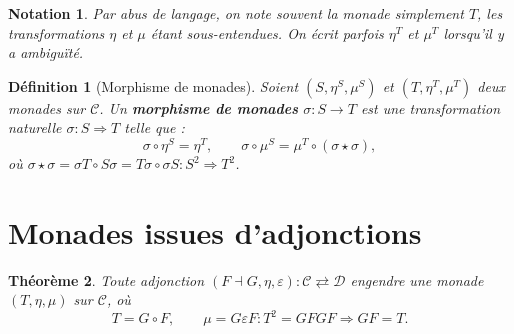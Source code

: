\documentclass[a4paper,12pt]{book}
\newtheorem{theoreme}{Théorème}[chapter]
\newtheorem{definition}[theoreme]{Définition}
\newtheorem*{notation}{Notation}
\begin{document}
\begin{notation}\label{not:monade}
Par abus de langage, on note souvent la monade simplement $T$,
les transformations $\eta$ et $\mu$ étant sous-entendues.
On écrit parfois $\eta^T$ et $\mu^T$ lorsqu'il y a ambiguïté.
\end{notation}

\begin{definition}[Morphisme de monades]\label{def:morphisme-monades}
Soient $(S, \eta^S, \mu^S)$ et $(T, \eta^T, \mu^T)$ deux monades
sur $\mathcal{C}$.
Un \textbf{morphisme de monades} $\sigma \colon S \to T$ est une
transformation naturelle $\sigma \colon S \Rightarrow T$ telle que :
\[
    \sigma \circ \eta^S = \eta^T, \qquad
    \sigma \circ \mu^S = \mu^T \circ (\sigma \star \sigma),
\]
où $\sigma \star \sigma = \sigma T \circ S\sigma = T\sigma \circ \sigma S
\colon S^2 \Rightarrow T^2$.
\end{definition}


\section{Monades issues d'adjonctions}\label{sec:monade-adjonction}

\begin{theoreme}\label{thm:adjonction-monade}
Toute adjonction $(F \dashv G, \eta, \varepsilon) \colon
\mathcal{C} \rightleftarrows \mathcal{D}$ engendre une monade
$(T, \eta, \mu)$ sur $\mathcal{C}$, où
\[
    T = G \circ F, \qquad
    \mu = G \varepsilon F \colon T^2 = GFGF \Rightarrow GF = T.
\]
\end{theoreme}
\end{document}
